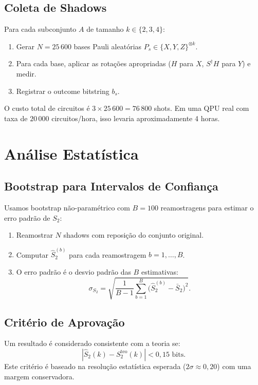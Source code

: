 \documentclass[12pt,a4paper,oneside]{book}
\theoremstyle{definition}
\theoremstyle{remark}
\begin{document}
\subsection{Coleta de Shadows}

Para cada subconjunto $A$ de tamanho $k \in \{2, 3, 4\}$:
\begin{enumerate}
    \item Gerar $N = 25\,600$ bases Pauli aleatórias $P_s \in \{X, Y, Z\}^{\otimes k}$.
    \item Para cada base, aplicar as rotações apropriadas ($H$ para $X$, $S^\dagger H$ para $Y$) e medir.
    \item Registrar o outcome bitstring $b_s$.
\end{enumerate}

O custo total de circuitos é $3 \times 25\,600 = 76\,800$ shots. Em uma QPU real com taxa de $20\,000$ circuitos/hora, isso levaria aproximadamente 4 horas.

\section{Análise Estatística}

\subsection{Bootstrap para Intervalos de Confiança}

Usamos bootstrap não-paramétrico com $B = 100$ reamostragens para estimar o erro padrão de $S_2$:
\begin{enumerate}
    \item Reamostrar $N$ shadows com reposição do conjunto original.
    \item Computar $\widehat{S}_2^{(b)}$ para cada reamostragem $b = 1, \dots, B$.
    \item O erro padrão é o desvio padrão das $B$ estimativas:
    \begin{equation}
        \sigma_{S_2} = \sqrt{\frac{1}{B-1} \sum_{b=1}^B \bigl(\widehat{S}_2^{(b)} - \bar{S}_2\bigr)^2}.
    \end{equation}
\end{enumerate}

\subsection{Critério de Aprovação}

Um resultado é considerado consistente com a teoria se:
\begin{equation}
    |\widehat{S}_2(k) - S_2^{\text{teo}}(k)| < 0{,}15 \text{ bits}.
\end{equation}
Este critério é baseado na resolução estatística esperada ($2\sigma \approx 0{,}20$) com uma margem conservadora.
\end{document}

